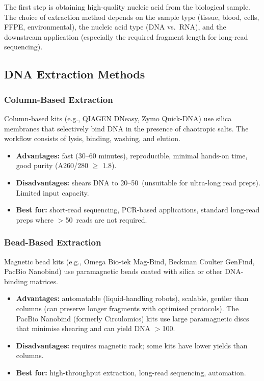 The first step is obtaining high-quality nucleic acid from the biological sample. The choice of extraction method depends on the sample type (tissue, blood, cells, FFPE, environmental), the nucleic acid type (DNA vs.\ RNA), and the downstream application (especially the required fragment length for long-read sequencing).

\subsection{DNA Extraction Methods}

\subsubsection{Column-Based Extraction}

Column-based kits (e.g., QIAGEN DNeasy, Zymo Quick-DNA) use silica membranes that selectively bind DNA in the presence of chaotropic salts. The workflow consists of lysis, binding, washing, and elution.

\begin{itemize}[nosep]
  \item \textbf{Advantages:} fast (30--60 minutes), reproducible, minimal hands-on time, good purity (A260/280 $\geq$ 1.8).
  \item \textbf{Disadvantages:} shears DNA to 20--50\kilobase\ (unsuitable for ultra-long read preps). Limited input capacity.
  \item \textbf{Best for:} short-read sequencing, PCR-based applications, standard long-read preps where $>$50\kilobase\ reads are not required.
\end{itemize}

\subsubsection{Bead-Based Extraction}

Magnetic bead kits (e.g., Omega Bio-tek Mag-Bind, Beckman Coulter GenFind, PacBio Nanobind) use paramagnetic beads coated with silica or other DNA-binding matrices.

\begin{itemize}[nosep]
  \item \textbf{Advantages:} automatable (liquid-handling robots), scalable, gentler than columns (can preserve longer fragments with optimised protocols). The PacBio Nanobind (formerly Circulomics) kits use large paramagnetic discs that minimise shearing and can yield DNA $>$100\kilobase.
  \item \textbf{Disadvantages:} requires magnetic rack; some kits have lower yields than columns.
  \item \textbf{Best for:} high-throughput extraction, long-read sequencing, automation.
\end{itemize}

